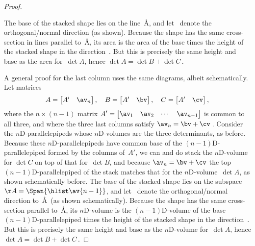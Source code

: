 \begin{proof}
\begin{center}
\end{center}
The base of the stacked shape lies on the line~\AA, and let \nv~denote the orthogonal\slash normal direction (as shown).
Because the shape has the same cross-section in lines parallel to~\AA, its area is the area of the base times the height of the stacked shape in the direction~\nv.
But this is precisely the same height and base as the area for~\(\det A\), hence \(\det A=\det B+\det C\)\,.

A general proof for the last column uses the same diagrams, albeit schematically. 
Let matrices
\begin{equation*}
A=\begin{bmatrix} A'& \av_n \end{bmatrix},\quad
B=\begin{bmatrix} A'& \bv \end{bmatrix},\quad
C=\begin{bmatrix} A'& \cv \end{bmatrix},
\end{equation*}
where the \(n\times(n-1)\) matrix \(A'=\begin{bmatrix} \av_1&\av_2&\cdots&\av_{n-1} \end{bmatrix}\) is common to all three,
and where the three last columns satisfy \(\av_n=\bv+\cv\)\,.
Consider the \(n\)D-parallelepipeds whose \(n\)D-volumes are the three determinants, as before.
Because these \(n\)D-parallelepipeds have common base of the \((n-1)\)D-parallelepiped formed by the columns of~\(A'\), we can and do stack the \(n\)D-volume for \(\det C\) on top of that for~\(\det B\), and because \(\av_n=\bv+\cv\) the top \((n-1)\)D-parallelepiped of the stack matches that for the \(n\)D-volume~\(\det A\), as shown schematically before.
The base of the stacked shape lies on the subspace \(\AA=\Span\{\hlist\av{n-1}\}\), and let \nv~denote the orthogonal\slash normal direction to~\AA\ (as shown schematically).
Because the shape has the same cross-section parallel to~\AA, its \(n\)D-volume is the \((n-1)\)D-volume of the base \((n-1)\)D-parallelepiped times the height of the stacked shape in the direction~\nv.
But this is precisely the same height and base as the \(n\)D-volume for~\(\det A\), hence \(\det A=\det B+\det C\)\,.


\end{proof}
